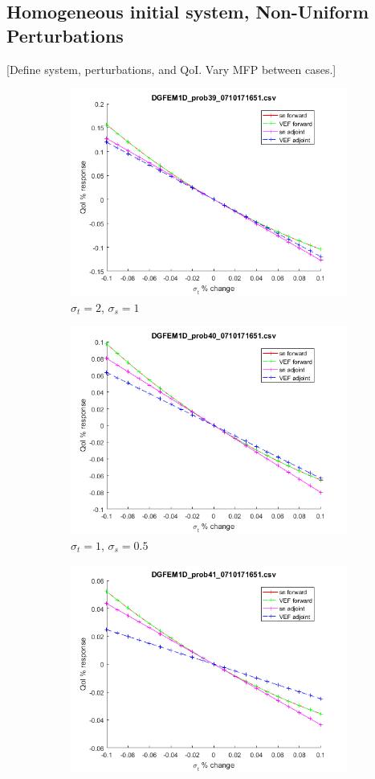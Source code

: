 \documentclass{article}
\newcommand{\sigt}{\sigma_t}
\newcommand{\sigs}{\sigma_s}
\begin{document}
\subsection{Homogeneous initial system, Non-Uniform Perturbations}
[Define system,  perturbations, and QoI. Vary MFP between cases.]
\begin{figure}[H]
\label{InHomoPertt}
\begin{subfigure}{.5\textwidth}
  \centering
  \includegraphics[width=.8\linewidth]{figures/39sigtSens.png}
  \caption{$\sigt=2$, $\sigs=1$}
  \label{fig:sfig1}
\end{subfigure}%
\begin{subfigure}{.5\textwidth}
  \centering
  \includegraphics[width=.8\linewidth]{figures/40sigtSens.png}
  \caption{$\sigt=1$, $\sigs=0.5$}
  \label{fig:sfig2}
\end{subfigure}
\begin{subfigure}{.5\textwidth}
  \centering
  \includegraphics[width=.8\linewidth]{figures/41sigtSens.png}

\end{subfigure}
\end{figure}
\end{document}
